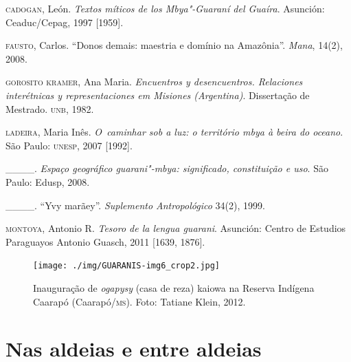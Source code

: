 \begin{Parskip}
\begin{samepage}
\textsc{cadogan}, León. \emph{Textos míticos de los Mbya"-Guaraní del Guaíra}. Asunción:
Ceaduc/Cepag, 1997 [1959].

\textsc{fausto}, Carlos. ``Donos demais: maestria e domínio na Amazônia''. \emph{Mana},
14(2), 2008. 

\textsc{gorosito} \textsc{kramer}, Ana Maria. \emph{Encuentros y desencuentros. Relaciones
interétnicas y representaciones em Misiones (Argentina)}. Dissertação de
Mestrado. \textsc{unb}, 1982.

\textsc{ladeira}, Maria Inês. \emph{O~caminhar sob a luz: o território mbya à beira do
oceano}. São Paulo: \textsc{unesp}, 2007 [1992].

\_\_\_\_. \emph{Espaço geográfico guarani"-mbya: significado, constituição e uso}.
São Paulo: Edusp, 2008.

\_\_\_\_. ``Yvy marãey''. \emph{Suplemento Antropológico} 34(2), 1999.

\textsc{montoya}, Antonio R. \emph{Tesoro de la lengua guarani}. Asunción: Centro de
Estudios Paraguayos Antonio Guasch, 2011 [1639, 1876].
\end{samepage}
\end{Parskip}

\pagebreak

\begin{absolutelynopagebreak}
\begin{vplace}
\begin{figure}[H]
\begin{adjustwidth}{-2.7cm}{}
 \vspace{-3.1cm}
 \texttt{[image: ./img/GUARANIS-img6\_crop2.jpg]}	
  \end{adjustwidth}
  \caption{Inauguração de \emph{ogapysy} (casa de reza) kaiowa na Reserva Indígena
Caarapó (Caarapó/\textsc{ms}). Foto: Tatiane Klein, 2012.}
\end{figure}
\end{vplace}

\end{absolutelynopagebreak}

\thispagestyle{empty}

\makeatletter\@openrightfalse
\movetooddpage
\part{Nas aldeias e entre aldeias}

